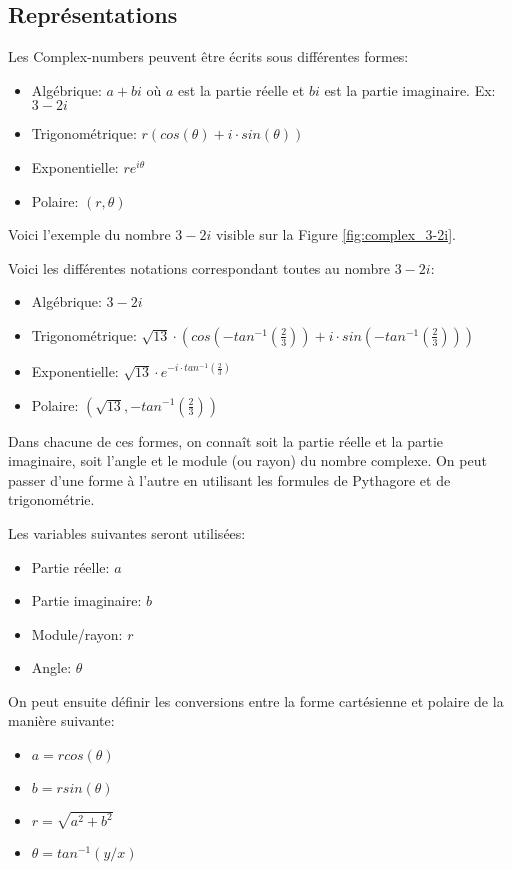 \subsection{Représentations}
\label{sec:complex_representations}

Les \glspl{Complex-number} peuvent être écrits sous différentes formes:

\begin{itemize}
    \item Algébrique: $a + bi$ où $a$ est la partie réelle et $bi$ est la partie imaginaire. Ex: $3 - 2i$
    \item Trigonométrique: $r(cos(\theta) + i \cdot sin(\theta))$
    \item Exponentielle: $re^{i\theta}$
    \item Polaire: $(r, \theta)$
\end{itemize}

Voici l'exemple du nombre $3 - 2i$ visible sur la Figure \ref{fig:complex_3-2i}.

\begin{minipage}{\linewidth}
\label{fig:complex_3-2i}
\end{minipage}

Voici les différentes notations correspondant toutes au nombre $3 - 2i$:

\begin{itemize}
    \item Algébrique: $3 - 2i$
    \item Trigonométrique: $\sqrt{13} \cdot (cos(-tan^{-1}(\frac{2}{3})) + i \cdot sin(-tan^{-1}(\frac{2}{3})))$
    \item Exponentielle: $\sqrt{13} \cdot e^{-i \cdot tan^{-1}(\frac{2}{3})}$
    \item Polaire: $(\sqrt{13}, -tan^{-1}(\frac{2}{3}))$
\end{itemize}

Dans chacune de ces formes, on connaît soit la partie réelle et la partie imaginaire, soit l'angle et le module (ou rayon) du nombre complexe. On peut passer d'une forme à l'autre en utilisant les formules de Pythagore et de trigonométrie.

Les variables suivantes seront utilisées:

\begin{itemize}
    \item Partie réelle: $a$
    \item Partie imaginaire: $b$
    \item Module/rayon: $r$
    \item Angle: $\theta$
\end{itemize}

On peut ensuite définir les conversions entre la forme cartésienne et polaire de la manière suivante:

\begin{itemize}
    \item $a = r cos(\theta)$
    \item $b = r sin(\theta)$
    \item $r = \sqrt{a^2 + b^2}$
    \item $\theta = tan^{-1}(y/x)$
\end{itemize}

